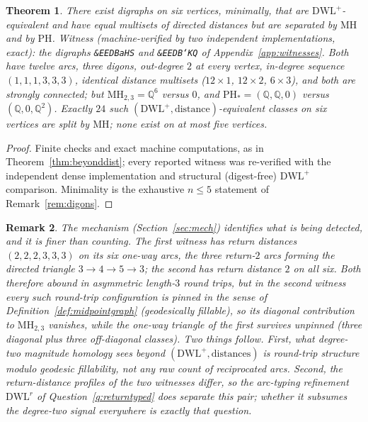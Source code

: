 \documentclass[pdflatex,sn-mathphys,Numbered]{sn-jnl}
\theoremstyle{thmstyleone}
\newtheorem{theorem}{Theorem}[section]
\theoremstyle{thmstyletwo}
\newtheorem{remark}[theorem]{Remark}
\newcommand{\MH}{\mathrm{MH}}
\newcommand{\PH}{\mathrm{PH}}
\newcommand{\QQ}{\mathbb{Q}}
\newcommand{\dwl}{\mathrm{DWL}}
\newcommand{\dwlp}{\mathrm{DWL}^{+}}
\begin{document}
\begin{theorem}\label{thm:beyonddwlp}
There exist digraphs on six vertices, minimally, that are
$\dwlp$-equivalent and have equal multisets of directed distances but
are separated by $\MH$ and by $\PH$. Witness (machine-verified by two
independent implementations, exact): the digraphs
\texttt{\&EEDBaHS} and \texttt{\&EEDB`KQ} of
Appendix~\ref{app:witnesses}. Both have twelve arcs, three digons,
out-degree $2$ at every vertex, in-degree sequence $(1,1,1,3,3,3)$,
identical distance multisets ($12 \times 1$, $12 \times 2$,
$6 \times 3$), and both are strongly connected; but
$\MH_{2,3} = \QQ^6$ versus $0$, and
$\PH_\ast = (\QQ, \QQ, 0)$ versus $(\QQ, 0, \QQ^2)$. Exactly $24$ such
$(\dwlp, \text{distance})$-equivalent classes on six vertices are split
by $\MH$; none exist on at most five vertices.
\end{theorem}

\begin{proof}
Finite checks and exact machine computations, as in
Theorem~\ref{thm:beyonddist}; every reported witness was re-verified
with the independent dense implementation and structural (digest-free)
$\dwlp$ comparison. Minimality is the exhaustive $n \le 5$ statement of
Remark~\ref{rem:digons}.
\end{proof}

\begin{remark}\label{rem:roundtripdepth}
The mechanism (Section~\ref{sec:mech}) identifies what is being
detected, and it is finer than counting. The first witness has return
distances $(2,2,2,3,3,3)$ on its six one-way arcs, the three return-$2$
arcs forming the directed triangle $3 \to 4 \to 5 \to 3$; the second
has return distance $2$ on all six. Both therefore abound in
asymmetric length-$3$ round trips, but in the second witness every
such round-trip configuration is pinned in the sense of
Definition~\ref{def:midpointgraph} (geodesically fillable), so its
diagonal contribution to $\MH_{2,3}$ vanishes, while the one-way
triangle of the first survives unpinned (three diagonal plus three
off-diagonal classes). Two things follow. First, what degree-two
magnitude homology sees beyond $(\dwlp, \text{distances})$ is
round-trip structure \emph{modulo geodesic fillability}, not any raw
count of reciprocated arcs. Second, the return-distance profiles of
the two witnesses differ, so the arc-typing refinement $\dwl^{r}$ of
Question~\ref{q:returntyped} does separate this pair; whether it
subsumes the degree-two signal everywhere is exactly that question.
\end{remark}
\end{document}
